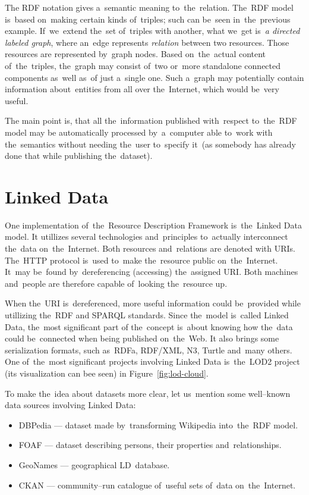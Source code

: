 The RDF notation gives a~semantic meaning to~the~relation. The~RDF model is~based on~making certain
kinds of~triples; such can be~seen in~the~previous example. If~we~extend the~set of~triples with another,
what we~get is~\emph{a directed labeled graph}, where an~edge represents \emph{relation} between two resources.
Those resources are represented by~graph nodes. Based on~the~actual content of~the~triples,
the~graph may consist of~two or~more standalone connected components as~well as~of
just a~single one. Such a~graph may potentially contain information about~entities from all over
the~Internet, which would be~very useful.

The main point is, that all the~information published with~respect to~the~RDF model may be
automatically processed by~a~computer able to~work with the~semantics without
needing the~user to~specify it~(as somebody has already done that while publishing the~dataset).

\section{Linked Data}

One implementation of~the~Resource Description Framework is~the~Linked Data model.
It utillizes several technologies and~principles to~actually interconnect the~data on~the~Internet.
Both resources and~relations are denoted with URIs. The~HTTP protocol is~used to~make
the~resource public on~the~Internet. It~may be~found by~dereferencing (accessing) the~assigned
URI. Both machines and~people are therefore capable of~looking the~resource up.

When the~URI is~dereferenced, more useful information could be~provided while utillizing the~RDF
and SPARQL standards. Since the~model is~called Linked Data, the~most significant part
of the~concept is~about knowing how the~data could be~connected when being published on~the~Web.
It also brings some serialization formats, such as~RDFa, RDF/XML, N3, Turtle and~many others.
One of~the~most significant projects involving Linked Data is~the~LOD2 project~\cite{lod2}
(its visualization can bee seen) in Figure~\ref{fig:lod-cloud}.

To make the~idea about datasets more clear, let us~mention some well--known data sources
involving Linked Data:

\begin{itemize}
\item DBPedia --- dataset made by~transforming Wikipedia into~the~RDF model.
\item FOAF --- dataset describing persons, their properties and~relationships.
\item GeoNames --- geographical LD~database.
\item CKAN --- community--run catalogue of~useful sets of~data on~the~Internet.
\end{itemize}

